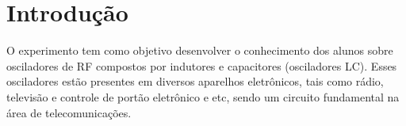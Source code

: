 \newpage

\section{Introdução}
O experimento tem como objetivo desenvolver o conhecimento dos alunos sobre osciladores de RF compostos por indutores e capacitores (osciladores LC). Esses osciladores estão presentes em diversos aparelhos eletrônicos, tais como rádio, televisão e controle de portão eletrônico e etc, sendo um circuito fundamental na área de telecomunicações. 